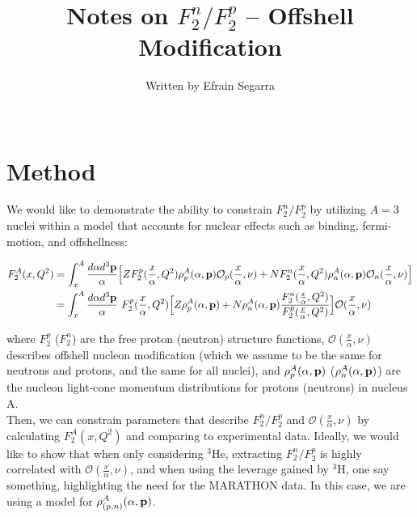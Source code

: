 \documentclass{article}
\title{Notes on $F_2^n/F_2^p$ -- Offshell Modification}
\author{Written by Efrain Segarra \\\\}
\date{}
\begin{document}
\maketitle


\section{\Large{Method}}
We would like to demonstrate the ability to constrain $F_2^n/F_2^p$ by utilizing $A=3$ nuclei within a model that 
accounts for nuclear effects such as binding, fermi-motion, and offshellness:

\begin{eqnarray}
	\centering
	\begin{split}
		F_2^A(x,Q^2) &= \int_x^A \frac{d\alpha d^3{\bf{p}}}{\alpha} \Big[ 
			Z F_2^p (\frac{x}{\alpha},Q^2)  \rho_p^A(\alpha,{\bf{p}}) \mathcal{O}_p(\frac{x}{\alpha},\nu) + 
			N F_2^n(\frac{x}{\alpha},Q^2) \rho_n^A(\alpha,{\bf{p}})\mathcal{O}_n(\frac{x}{\alpha},\nu) 
		\Big]																			\\
					&= \int_x^A \frac{d\alpha d^3{\bf{p}}}{\alpha} \ F_2^p(\frac{x}{\alpha},Q^2) \Big[
					Z \rho_p^A(\alpha,{\bf{p}}) + N \rho_n^A(\alpha,{\bf{p}}) \frac{F_2^n(\frac{x}{\alpha},Q^2)}{F_2^p(\frac{x}{\alpha},Q^2)}
					\Big]  \mathcal{O}(\frac{x}{\alpha},\nu)
	\end{split}
\end{eqnarray}

where $F_2^p$ ($F_2^n$) are the free proton (neutron) structure functions, $\mathcal{O}(\frac{x}{\alpha},\nu)$ describes offshell nucleon modification 
(which we assume to be the same for neutrons and protons, and the same for all nuclei), and $\rho_p^A(\alpha,{\bf{p}})$ ($\rho_n^A(\alpha,{\bf{p}})$) are the 
nucleon light-cone momentum distributions for protons (neutrons) in nucleus A. \\

Then, we can constrain parameters that describe $F_2^n/F_2^p$ and $ \mathcal{O}(\frac{x}{\alpha},\nu)$ by calculating $F_2^A(x,Q^2)$ and comparing to 
experimental data. Ideally, we would like to show that when only considering $^3$He, extracting $F_2^n/F_2^p$ is highly correlated with 
$ \mathcal{O}(\frac{x}{\alpha},\nu)$, and when using the leverage gained by  $^3$H, one say something, highlighting the need for the MARATHON data. In this 
case, we are using a model for $\rho_{(p,n)}^A(\alpha,{\bf{p}})$.
\end{document}
